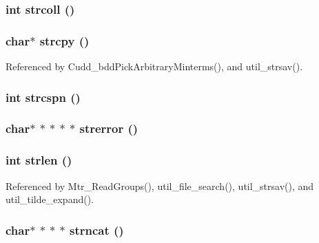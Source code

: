 \subsubsection{\setlength{\rightskip}{0pt plus 5cm}int strcoll ()}\label{util_8h_7f0a2c38f71c3a4d57320f3f07582085}


\subsubsection{\setlength{\rightskip}{0pt plus 5cm}char$\ast$ strcpy ()}\label{util_8h_dd539a5755e4c4070b0c8ca97477fe47}




Referenced by Cudd\_\-bdd\-Pick\-Arbitrary\-Minterms(), and util\_\-strsav().
\subsubsection{\setlength{\rightskip}{0pt plus 5cm}int strcspn ()}\label{util_8h_400ca51e66dc11efb3d8ef17ced1ffa4}


\subsubsection{\setlength{\rightskip}{0pt plus 5cm}char$\ast$ $\ast$ $\ast$ $\ast$ $\ast$ strerror ()}\label{util_8h_c2e073ac90061f4c7474b7aa3404c2de}


\subsubsection{\setlength{\rightskip}{0pt plus 5cm}int strlen ()}\label{util_8h_492442620ce65db20fe7297b43cbca65}




Referenced by Mtr\_\-Read\-Groups(), util\_\-file\_\-search(), util\_\-strsav(), and util\_\-tilde\_\-expand().
\subsubsection{\setlength{\rightskip}{0pt plus 5cm}char$\ast$ $\ast$ $\ast$ $\ast$ strncat ()}\label{util_8h_83e6362ddfdc91cb9b9859a4da829fac}


